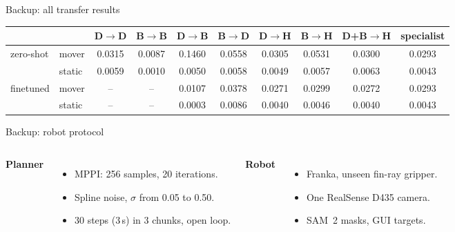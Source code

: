 \documentclass[aspectratio=169,12pt]{beamer}
\begin{document}
\begin{frame}[label=bk-transfer]{Backup: all transfer results}
  \centering
  {\scriptsize
  \setlength{\tabcolsep}{5pt}
  \begin{tabular}{@{}ll*{7}{c}c@{}}
    \toprule
    & & D$\to$D & B$\to$B & D$\to$B & B$\to$D & D$\to$H & B$\to$H & D+B$\to$H & specialist \\
    \midrule
    zero-shot & mover & 0.0315 & 0.0087 & 0.1460 & 0.0558 & 0.0305 & 0.0531 & 0.0300 & 0.0293 \\
      & static & 0.0059 & 0.0010 & 0.0050 & 0.0058 & 0.0049 & 0.0057 & 0.0063 & 0.0043 \\
    \midrule
    finetuned & mover & -- & -- & 0.0107 & 0.0378 & 0.0271 & 0.0299 & 0.0272 & 0.0293 \\
      & static & -- & -- & 0.0003 & 0.0086 & 0.0040 & 0.0046 & 0.0040 & 0.0043 \\
    \bottomrule
  \end{tabular}\par}
  \par
  \vfill
  \vfill
  \vfill
\end{frame}

\begin{frame}[label=bk-protocol]{Backup: robot protocol}
  \vfill
  \small
  \begin{columns}[t, onlytextwidth]
      {\bfseries\color{pw} Planner}
      \begin{itemize}\setlength{\itemsep}{10pt}
        \item MPPI: 256 samples, 20 iterations.
        \item Spline noise, $\sigma$ from 0.05 to 0.50.
        \item 30 steps (3\,s) in 3 chunks, open loop.
      \end{itemize}
      {\bfseries\color{pw} Robot}
      \begin{itemize}\setlength{\itemsep}{10pt}
        \item Franka, unseen fin-ray gripper.
        \item One RealSense D435 camera.
        \item SAM~2 masks, GUI targets.
      \end{itemize}
  \end{columns}
  \vspace{14pt}
  \vfill
\end{frame}
\end{document}
